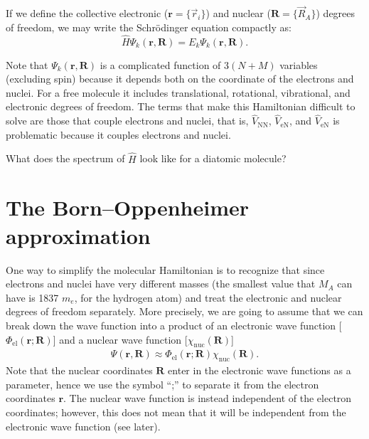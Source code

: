 \documentclass[../Main/chem532-notes.tex]{subfiles}
\begin{document}
If we define the collective electronic ($\mathbf{r} = \{ \vec{r}_i \}$) and nuclear ($\mathbf{R} = \{ \vec{R}_A \}$) degrees of freedom, we may write the Schr\"{o}dinger equation compactly as:
\begin{equation}
\hat{H} \Psi_k(\mathbf{r},\mathbf{R}) = E_k \Psi_k(\mathbf{r},\mathbf{R}).
\end{equation}

Note that $\Psi_k(\mathbf{r},\mathbf{R})$ is a complicated function of $3(N+M)$ variables (excluding spin) because it depends both on the coordinate of the electrons and nuclei. For a free molecule it includes translational, rotational, vibrational, and electronic degrees of freedom.
The terms that make this Hamiltonian difficult to solve are those that couple electrons and nuclei, that is, $\hat{V}_\mathrm{NN}$, $\hat{V}_\mathrm{eN}$, and $\hat{V}_\mathrm{eN}$ is problematic because it couples electrons and nuclei.

\begin{problem}	
What does the spectrum of $\hat{H}$ look like for a diatomic molecule?
\end{problem}



\section{The Born--Oppenheimer approximation}
One way to simplify the molecular Hamiltonian is to recognize that since electrons and nuclei have very different masses (the smallest value that $M_A$ can have is 1837 $m_e$, for the hydrogen atom) and treat the electronic and nuclear degrees of freedom separately.
More precisely, we are going to assume that we can break down the wave function into a product of an electronic wave function [$\Phi_{\mathrm{el}}(\mathbf{r};\mathbf{R})$] and a nuclear wave function [$\chi_{\mathrm{nuc}}(\mathbf{R})$]
\begin{equation}
\begin{split}
\Psi(\mathbf{r},\mathbf{R}) \approx \Phi_{\mathrm{el}}(\mathbf{r};\mathbf{R}) \chi_{\mathrm{nuc}}(\mathbf{R}).
\end{split}
\end{equation}
Note that the nuclear coordinates $\mathbf{R}$ enter in the electronic wave functions as a parameter, hence we use the symbol ``;'' to separate it from the electron coordinates $\mathbf{r}$. The nuclear wave function is instead independent of the electron coordinates; however, this does not mean that it will be independent from the electronic wave function (see later).
\end{document}
